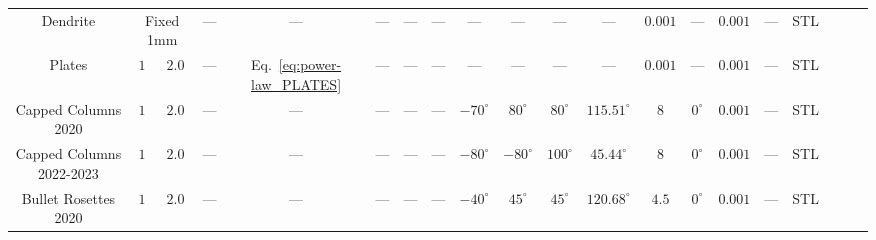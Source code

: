 \documentclass[amt, manuscript]{copernicus}
\begin{document}
\begin{table}[ht]
{\begin{tabular}{c c c c c c c c c c c c c c c c c c c c}
Dendrite &  \multicolumn{2}{c}{Fixed 1mm}  & --- & --- & --- & --- & --- & --- & --- & --- & --- & $0.001$ & --- & $0.001$ & --- & STL\\
Plates & $1$ & $2.0$ & --- & Eq.~\ref{eq:power-law_PLATES} & --- & --- & --- & --- & --- & --- &  --- & $0.001$ & --- & $0.001$ & --- & STL\\
Capped Columns 2020 & $1$ & $2.0$ & --- & --- & --- & --- & --- & $-70^{\circ}$ & $80^{\circ}$ &  $80^{\circ}$ & $115.51^{\circ}$ &  8 & $0^{\circ}$ & $0.001$ & --- & STL\\
Capped Columns 2022-2023 & $1$ & $2.0$ & --- & --- & --- & ---  & --- & $-80^{\circ}$ & $-80^{\circ}$ & $100^{\circ}$& $45.44^{\circ}$ & 8 & $0^{\circ}$ & $0.001$ & --- & STL\\
Bullet Rosettes 2020 & $1$ & $2.0$ & --- & --- & ---  &  --- & --- & $-40^{\circ}$ & $45^{\circ}$ &  $45^{\circ}$ & $120.68^{\circ}$ &  $4.5$ & $0^{\circ}$ & $0.001$ & --- & STL\\
\bottomrule
\end{tabular}%
}
\label{table:ellip_orient_tests}
\end{table}
\FloatBarrier

\end{document}

